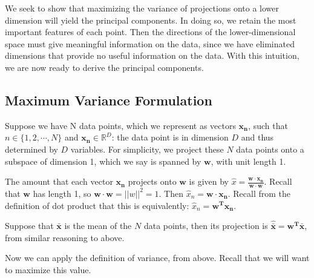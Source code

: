 \documentclass{article}
\begin{document}
\noindent{}

\vspace{3mm}
\noindent  We seek to show that maximizing the variance of projections onto a lower dimension will yield the principal components. In doing so, we retain the most important features of each point. Then the directions of the lower-dimensional space must give meaningful information on the data, since we have eliminated dimensions that provide no useful information on the data. With this intuition, we are now ready to derive the principal components.


\subsection{Maximum Variance Formulation}
Suppose we have N data points, which we represent as vectors $\mathbf{x_n}$, such that $n \in \{1, 2, \cdots, N\}$ and $\mathbf{x_n} \in \mathbb{R}^D$: the data point is in dimension $D$ and thus determined by $D$ variables. For simplicity, we project these $N$ data points onto a subspace of dimension 1, which we say is spanned by $\mathbf{w}$, with unit length 1.

\vspace{2mm}
\noindent The amount that each vector $\mathbf{x_n}$ projects onto $\mathbf{w}$ is given by $\hat{x} = \frac{\mathbf{w} \cdot \mathbf{x_n}}{\mathbf{w \cdot w}}$. Recall that $\mathbf{w}$ has length 1, so $\mathbf{w} \cdot \mathbf{w} = ||w||^2 = 1$. Then $\hat{x}_n = \mathbf{w \cdot x_n}$. Recall from the definition of dot product that this is equivalently: $\hat{x}_n = \mathbf{w^T}\mathbf{x_n}$.

\vspace{2mm}
\noindent Suppose that $\bar{\mathbf{x}}$ is the mean of the $N$ data points, then its projection is $\hat{\bar{\mathbf{x}}} = \mathbf{w^T}\mathbf{\bar{\mathbf{x}}}$, from similar reasoning to above.

\vspace{2mm}
\noindent Now we can apply the definition of variance, from above. Recall that we will want to maximize this value. 
\end{document}
